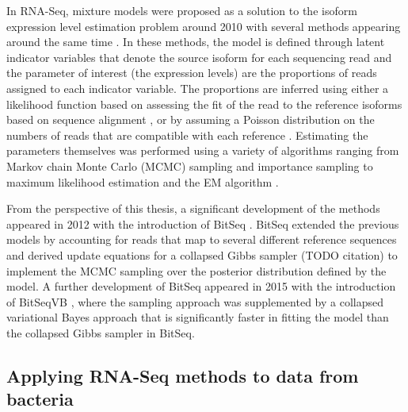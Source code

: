 \documentclass[officiallayout]{tktla}
\begin{document}
In RNA-Seq, mixture models were proposed as a solution to the isoform
expression level estimation problem around 2010 with several methods
appearing around the same time \citep{katz2010analysis, li2010rna,
  jiang2009statistical, wang2010isoform}. In these methods, the model
is defined through latent indicator variables that denote the source
isoform for each sequencing read and the parameter of interest (the
expression levels) are the proportions of reads assigned to each
indicator variable. The proportions are inferred using either a
likelihood function based on assessing the fit of the read to the
reference isoforms based on sequence alignment
\citep{katz2010analysis, li2010rna}, or by assuming a Poisson
distribution on the numbers of reads that are compatible with each
reference \citep{jiang2009statistical, wang2010isoform}. Estimating
the parameters themselves was performed using a variety of algorithms
ranging from Markov chain Monte Carlo (MCMC) sampling
\citep{katz2010analysis} and importance sampling
\citep{jiang2009statistical} to maximum likelihood estimation
\citep{wang2010isoform} and the EM algorithm \citep{li2010rna}.

From the perspective of this thesis, a significant development of the
methods appeared in 2012 with the introduction of BitSeq
\citep{glaus2012identifying}. BitSeq extended the previous models by
accounting for reads that map to several different reference sequences
and derived update equations for a collapsed Gibbs sampler (TODO
citation) to implement the MCMC sampling over the posterior
distribution defined by the model. A further development of BitSeq
appeared in 2015 with the introduction of BitSeqVB
\citep{hensman2015fast}, where the sampling approach was supplemented
by a collapsed variational Bayes approach that is significantly faster
in fitting the model than the collapsed Gibbs sampler in BitSeq.

\subsection{Applying RNA-Seq methods to data from bacteria}
\end{document}
